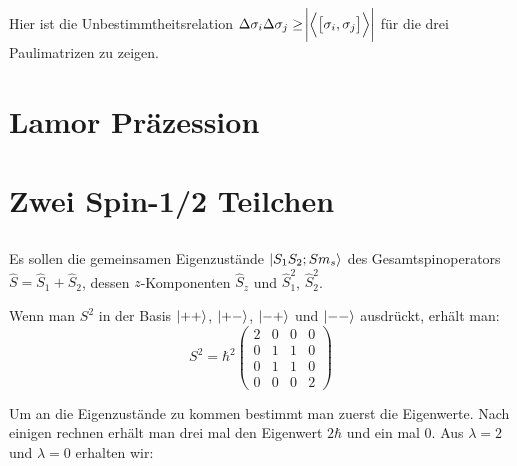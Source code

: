 \subsection{}

Hier ist die Unbestimmtheitsrelation
$\Delta\sigma_i\Delta\sigma_j\geq\abs{\mw{\sbr{\sigma_i,\sigma_j}}}$ für die
drei Paulimatrizen zu zeigen.

\section{Lamor Präzession}

\section{Zwei Spin-1/2 Teilchen}
\subsection{}

Es sollen die gemeinsamen Eigenzustände $\left|S_1S_2;Sm_s\right\rangle$ des
Gesamtspinoperators $\hat S=\hat S_1+\hat S_2$, dessen $z$-Komponenten $\hat
S_z$ und $\hat S_1^2$, $\hat S_2^2$.

Wenn man $S^2$ in der Basis $\left|++\right\rangle$, $\left|+-\right\rangle$, $\left|-+\right\rangle$ und $\left|--\right\rangle$
ausdrückt, erhält man:
\[
    S^2 = \hbar^2 \begin{pmatrix}
        2 &0 &0 &0 \\
        0 &1 &1 &0 \\
        0 &1 &1 &0 \\
        0 &0 &0 &2
    \end{pmatrix}
\]

Um an die Eigenzustände zu kommen bestimmt man zuerst die Eigenwerte. Nach einigen rechnen erhält man drei mal den Eigenwert $2\hbar$ und ein mal 0. 
Aus $\lambda = 2$ und $\lambda = 0$ erhalten wir:

